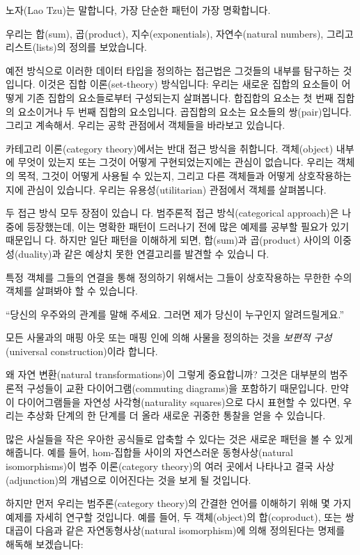 \documentclass[DaoFP]{subfiles}
\begin{document}
노자(Lao Tzu)는 말합니다, 가장 단순한 패턴이 가장 명확합니다.

우리는 합(sum), 곱(product), 지수(exponentials), 자연수(natural numbers), 그리고 리스트(lists)의 정의를 보았습니다.

예전 방식으로 이러한 데이터 타입을 정의하는 접근법은 그것들의 내부를 탐구하는 것입니다. 이것은 집합 이론(set-theory) 방식입니다: 우리는 새로운 집합의 요소들이 어떻게 기존 집합의 요소들로부터 구성되는지 살펴봅니다. 합집합의 요소는 첫 번째 집합의 요소이거나 두 번째 집합의 요소입니다. 곱집합의 요소는 요소들의 쌍(pair)입니다. 그리고 계속해서. 우리는 공학 관점에서 객체들을 바라보고 있습니다.

카테고리 이론(category theory)에서는 반대 접근 방식을 취합니다. 객체(object) 내부에 무엇이 있는지 또는 그것이 어떻게 구현되었는지에는 관심이 없습니다. 우리는 객체의 목적, 그것이 어떻게 사용될 수 있는지, 그리고 다른 객체들과 어떻게 상호작용하는지에 관심이 있습니다. 우리는 유용성(utilitarian) 관점에서 객체를 살펴봅니다.

두 접근 방식 모두 장점이 있습니 다. 범주론적 접근 방식(categorical approach)은 나중에 등장했는데, 이는 명확한 패턴이 드러나기 전에 많은 예제를 공부할 필요가 있기 때문입니 다. 하지만 일단 패턴을 이해하게 되면, 합(sum)과 곱(product) 사이의 이중성(duality)과 같은 예상치 못한 연결고리를 발견할 수 있습니 다.

특정 객체를 그들의 연결을 통해 정의하기 위해서는 그들이 상호작용하는 무한한 수의 객체를 살펴봐야 할 수 있습니다.

``당신의 우주와의 관계를 말해 주세요. 그러면 제가 당신이 누구인지 알려드릴게요.''

모든 사물과의 매핑 아웃 또는 매핑 인에 의해 사물을 정의하는 것을 \emph{보편적 구성}(universal construction)이라 합니다.

왜 자연 변환(natural transformations)이 그렇게 중요합니까? 그것은 대부분의 범주론적 구성들이 교환 다이어그램(commuting diagrams)을 포함하기 때문입니다. 만약 이 다이어그램들을 자연성 사각형(naturality squares)으로 다시 표현할 수 있다면, 우리는 추상화 단계의 한 단계를 더 올라 새로운 귀중한 통찰을 얻을 수 있습니다.

많은 사실들을 작은 우아한 공식들로 압축할 수 있다는 것은 새로운 패턴을 볼 수 있게 해줍니다. 
예를 들어, hom-집합들 사이의 자연스러운 동형사상(natural isomorphisms)이 범주 이론(category theory)의 여러 곳에서 나타나고 
결국 사상(adjunction)의 개념으로 이어진다는 것을 보게 될 것입니다.

하지만 먼저 우리는 범주론(category theory)의 간결한 언어를 이해하기 위해 몇 가지 예제를 자세히 연구할 것입니다. 예를 들어, 두 객체(object)의 합(coproduct), 또는 쌍대곱이 다음과 같은 자연동형사상(natural isomorphism)에 의해 정의된다는 명제를 해독해 보겠습니다:
\end{document}
